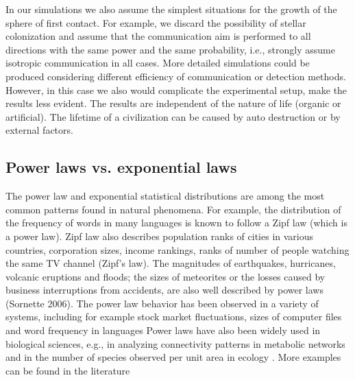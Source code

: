 In our simulations we also assume the simplest situations for the
growth of the sphere of first contact.
%
For example, we discard the possibility of stellar colonization
\citep[e.g.][]{newman_galactic_1981, walters_interstellar_1980,
starling_virulence_2013, barlow_galactic_2012, jeong_large_2000,
maccone_mathematical_2011} and assume that the communication aim is
performed to all directions with the same power and the same
probability, i.e., strongly assume isotropic communication in all
cases.
%
More detailed simulations could be produced considering different
efficiency of communication or detection methods.
%
However, in this case we also would complicate the experimental setup,
make the results less evident.
%
The results are independent of the nature of life (organic or
artificial).
%
The lifetime of a civilization can be caused by auto destruction or by
external factors.


 
\subsection{Power laws vs. exponential laws}\label{SS_PDF_shape}

The power law and exponential statistical distributions are among the
most common patterns found in natural phenomena.
%
For example, the distribution of the frequency of words in many
languages is known to follow a Zipf law (which is a power law).
%
Zipf law also describes population ranks of cities in various
countries, corporation sizes, income rankings, ranks of number of
people watching the same TV channel (Zipf's law).
%
%
The magnitudes of earthquakes, hurricanes, volcanic eruptions and
floods; the sizes of meteorites or the losses caused by business
interruptions from accidents, are also well described by power laws
(Sornette 2006).
%
The power law behavior has been observed in a variety of systems,
including for example stock market fluctuations, sizes of computer
files and word frequency in languages \citep{mitzenmacher_brief_2004,
newman_power_2005, simkin_theory_2006}
%
Power laws have also been widely used in biological sciences, e.g., in
analyzing connectivity patterns in metabolic networks
\citep{jeong_large_2000} and in the number of species observed per
unit area in ecology \citep{martin_origin_2006, frank_common_2009}.
% 
More examples can be found in the literature
\citep{martin_origin_2006, maccone_KLT_2010, barabasi_scale_2009,
maccone_evolution_2014, maccone_lognormals_2014,
benguigui_classificacion_2016}
 


